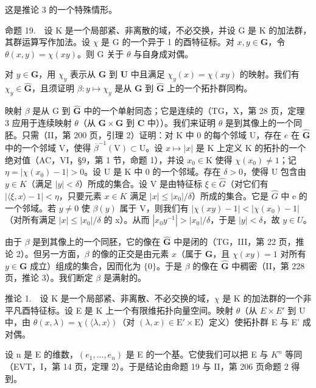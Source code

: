 这是推论 3 的一个特殊情形。

命题 19.　设 K 是一个局部紧、非离散的域，不必交换，并设 G 是 K 的加法群，其群运算写作加法。设 \(\chi\) 是 G 的一个异于 1 的酉特征标。对 \(x,y\in\mathbf{G}\)，令 \(\theta(x,y)=\chi(xy)\)。则 G 关于 \(\theta\) 与自身成对偶。

对 \(y \in \mathbf{G}\)，用 \(\chi_y\) 表示从 \(\mathbf{G}\) 到 \(\mathbf{U}\) 中且满足 \(\chi_y(x) = \chi(xy)\) 的映射。我们有 \(\chi_y \in \widehat{\mathbf{G}}\)，且须证明 \(\beta: y \mapsto \chi_y\) 是从 \(\mathbf{G}\) 到 \(\widehat{\mathbf{G}}\) 上的一个拓扑群同构。

映射 \(\beta\) 是从 G 到 \(\widehat{\mathbf{G}}\) 中的一个单射同态；它是连续的（TG，X，第 28 页，定理 3 应用于连续映射 \(\theta\)（从 \(\mathbf{G} \times \mathbf{G}\) 到 \(\mathbf{C}\) 中））。我们来证明 \(\theta\) 是到其像上的一个同胚。只需（II，第 200 页，引理 2）证明：对 K 中 0 的每个邻域 U，存在 \(e\) 在 \(\widehat{\mathbf{G}}\) 中的一个邻域 V，使得 \(\overline{\beta}^{-1}(\mathrm{V}) \subset \mathrm{U}\)。设 \(x \mapsto |x|\) 是 K 上定义 K 的拓扑的一个绝对值（AC，VI，§9，第 1 节，命题 1），并设 \(x_0 \in \mathrm{K}\) 使得 \(\chi(x_{0}) \neq 1\)；记 \(\eta = |\chi(x_{0}) - 1| > 0\)。设 U 是 K 中 0 的一个邻域。存在 \(\delta > 0\)，使得 U 包含由 \(y \in K\)（满足 \(|y| < \delta\)）所成的集合。设 V 是由特征标 \(\xi \in \widehat{G}\)（对它们有 \(|\langle\xi, x\rangle - 1| < \eta\)，只要元素 \(x \in K\) 满足 \(|x| \leqslant |x_{0}|/\delta\)）所成的集合。它是 \(\widehat{G}\) 中 e 的一个邻域。若 \(y \neq 0\) 使 \(\beta(y)\) 属于 V，则我们有 \(|\chi(xy) - 1| < |\chi(x_{0}) - 1|\)（对所有满足 \(|x| \leqslant |x_{0}|/\delta\) 的 x）。从而 \(|x_{0}y^{-1}| > |x_{0}|/\delta\)，于是 \(|y| < \delta\)，故 \(y \in U\)。

由于 \(\beta\) 是到其像上的一个同胚，它的像在 \(\widehat{\mathbf{G}}\) 中是闭的（TG，III，第 22 页，推论 2）。但另一方面，\(\beta\) 的像的正交是由元素 \(x\)（属于 \(\mathbf{G}\)，且 \(\chi(xy) = 1\) 对所有 \(y \in \mathbf{G}\) 成立）组成的集合，因而化为 \(\{0\}\)。于是 \(\beta\) 的像在 \(\widehat{\mathbf{G}}\) 中稠密（II，第 228 页，推论 3）。我们断定 \(\beta\) 是满射的。

推论 1.　设 K 是一个局部紧、非离散、不必交换的域，\(\chi\) 是 K 的加法群的一个非平凡酉特征标。设 E 是 K 上一个有限维拓扑向量空间。映射 \(\theta\)（从 \(E \times E'\) 到 U 中，由 \(\theta(x,\lambda)=\chi(\langle\lambda,x\rangle)\)（对 \((\lambda,x)\in\mathrm{E}'\times\mathrm{E}\)）定义）使拓扑群 E 与 E' 成对偶。

设 n 是 E 的维数，\((e_{1},\ldots,e_{n})\) 是 E 的一个基。它使我们可以把 E 与 \(K^{n}\) 等同（EVT，I，第 14 页，定理 2）。于是结论由命题 19 与 II，第 206 页命题 2 得到。

